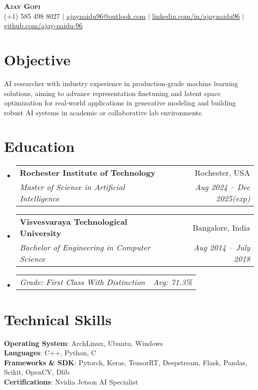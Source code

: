 \documentclass[letterpaper,10pt]{article}
\makeatletter
\newcommand{\resumeSubheading}[4]{
  \vspace{-2pt}\item
    \begin{tabular*}{0.97\textwidth}[t]{l@{\extracolsep{\fill}}r}
      \textbf{#1} & #2 \\
      \textit{\small#3} & \textit{\small #4} \\
    \end{tabular*}\vspace{-7pt}
}
\newcommand{\resumeSubSubheading}[2]{
    \item
    \begin{tabular*}{0.97\textwidth}{l@{\extracolsep{\fill}}r}
      \textit{\small#1} & \textit{\small #2} \\
    \end{tabular*}\vspace{-7pt}
}
\newcommand{\resumeSubHeadingListStart}{\begin{itemize}[leftmargin=0.15in, label={}]}
\newcommand{\resumeSubHeadingListEnd}{\end{itemize}}
\makeatother
\begin{document}
\begin{center}
    \textbf{\Huge \scshape Ajay Gopi} \\ \vspace{1pt}
    \small (+1) 585 498 8027 $|$ \href{mailto:ajaynaidu96@outlook.com}{\underline{ajaynaidu96@outlook.com}} $|$ 
    \href{https://www.linkedin.com/in/ajaynaidu96/}{\underline{linkedin.com/in/ajaynaidu96}} $|$
    \href{https://github.com/ajay-naidu-96/}{\underline{github.com/ajay-naidu-96}}
\end{center}


\section{Objective}
AI researcher with industry experience in production-grade machine learning solutions, aiming to advance representation finetuning and latent space optimization for real-world applications in generative modeling and building robust AI systems in academic or collaborative lab environments.

\section{Education}
\resumeSubHeadingListStart
  \resumeSubheading
    {Rochester Institute of Technology}{Rochester, USA}
    {Master of Science in Artificial Intelligence}{Aug 2024 -- Dec 2025(exp)}
  \resumeSubheading
    {Visvesvaraya Technological University}{Bangalore, India}
    {Bachelor of Engineering in Computer Science}{Aug 2014 -- July 2018}
    \resumeSubSubheading
      {Grade: First Class With Distinction}{Avg: 71.3\%}
\resumeSubHeadingListEnd

  \section{Technical Skills}
    \begin{itemize}[leftmargin=0.15in, label={}]
      \small{\item{
      \textbf{Operating System}{: ArchLinux, Ubuntu, Windows} \\
      \textbf{Languages}{: C++, Python, C} \\
      \textbf{Frameworks \& SDK}{: Pytorch, Keras, TensorRT, Deepstream, Flask, Pandas, Scikit, OpenCV, Dlib} \\
      \textbf{Certifications}{: Nvidia Jetson AI Specialist}
      }}
    \end{itemize}
\end{document}
